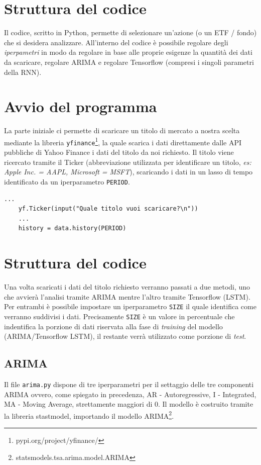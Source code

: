 \documentclass[a4paper,12pt]{article}
\begin{document}
\begin{itemize}
    \end{itemize}

    \section*{Struttura del codice}Il codice, scritto in Python, permette 
    di selezionare un'azione (o un ETF / fondo) che si desidera analizzare.
    All'interno del codice è possibile regolare degli
    \textit{iperpametri} in modo da regolare in base alle proprie esigenze
    la quantità dei dati da scaricare, regolare ARIMA e regolare Tensorflow
    (compresi i singoli parametri della RNN).

    \section{Avvio del programma}La parte iniziale ci permette di scaricare
    un titolo di mercato a nostra scelta mediante la libreria 
    \lstinline|yfinance|\footnote[3]{pypi.org/project/yfinance/}, la quale 
    scarica i dati direttamente dalle API pubbliche di Yahoo Finance i dati
    del titolo da noi richiesto. Il titolo viene ricercato tramite il 
    Ticker (abbreviazione utilizzata per identificare un titolo, 
    \textit{es: Apple Inc. = AAPL, Microsoft = MSFT}), scaricando i dati
    in un lasso di tempo identificato da un iperparametro 
    \lstinline|PERIOD|.
    \begin{lstlisting}[frame=single]
    ...            
    yf.Ticker(input("Quale titolo vuoi scaricare?\n"))
    ...
    history = data.history(PERIOD)
    \end{lstlisting}
    

    \section{Struttura del codice}Una volta scaricati i dati del titolo 
    richiesto verranno passati a due metodi, uno che avvierà l'analisi tramite 
    ARIMA mentre l'altro tramite Tensorflow (LSTM). Per entrambi è possibile 
    impostare un iperparametro \lstinline|SIZE| il quale identifica come 
    verranno suddivisi i dati. Precisamente \lstinline|SIZE| è un valore
    in percentuale che indentifica la porzione di dati riservata alla fase
    di \textit{training} del modello (ARIMA/Tensorflow LSTM), il restante
    verrà utilizzato come porzione di \textit{test}.

        \subsection{ARIMA}Il file \lstinline|arima.py| dispone di tre 
        iperparametri per il settaggio delle tre componenti ARIMA ovvero,
        come spiegato in precedenza, AR - Autoregressive, I - Integrated,
        MA - Moving Average, strettamente maggiori di 0. Il modello è 
        costruito tramite la libreria stastmodel, importando il modello 
        ARIMA\footnote[5]{statsmodels.tsa.arima.model.ARIMA}.
\end{document}

